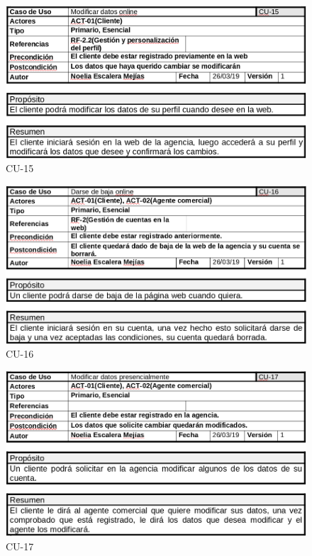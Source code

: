 \documentclass{article}
\begin{document}
	\begin{figure}[H]
		\centering
		\includegraphics[totalheight=8cm]{cu-15}
		\caption{CU-15}
		\label{fig:cu-15}
	\end{figure}

	\begin{figure}[H]
		\centering
		\includegraphics[totalheight=8cm]{cu-16}
		\caption{CU-16}
		\label{fig:cu-16}
	\end{figure}

	\begin{figure}[H]
		\centering
		\includegraphics[totalheight=8cm]{cu-17}
		\caption{CU-17}
		\label{fig:cu-17}
	\end{figure}
\end{document}
